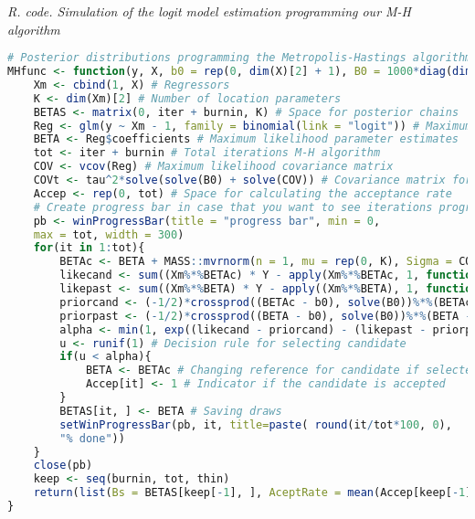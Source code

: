 \begin{tcolorbox}[enhanced,width=4.67in,center upper,
	fontupper=\large\bfseries,drop shadow southwest,sharp corners]
	\textit{R. code. Simulation of the logit model estimation programming our M-H algorithm}
	\begin{VF}
		\begin{lstlisting}[language=R]		
# Posterior distributions programming the Metropolis-Hastings algorithm
MHfunc <- function(y, X, b0 = rep(0, dim(X)[2] + 1), B0 = 1000*diag(dim(X)[2] + 1), tau = 1, iter = 6000, burnin = 1000, thin = 5){
	Xm <- cbind(1, X) # Regressors
	K <- dim(Xm)[2] # Number of location parameters
	BETAS <- matrix(0, iter + burnin, K) # Space for posterior chains
	Reg <- glm(y ~ Xm - 1, family = binomial(link = "logit")) # Maximum likelihood estimation
	BETA <- Reg$coefficients # Maximum likelihood parameter estimates 
	tot <- iter + burnin # Total iterations M-H algorithm
	COV <- vcov(Reg) # Maximum likelihood covariance matrix
	COVt <- tau^2*solve(solve(B0) + solve(COV)) # Covariance matrix for the proposal distribution
	Accep <- rep(0, tot) # Space for calculating the acceptance rate
	# Create progress bar in case that you want to see iterations progress
	pb <- winProgressBar(title = "progress bar", min = 0,
	max = tot, width = 300)
	for(it in 1:tot){
		BETAc <- BETA + MASS::mvrnorm(n = 1, mu = rep(0, K), Sigma = COVt) # Candidate location parameter
		likecand <- sum((Xm%*%BETAc) * Y - apply(Xm%*%BETAc, 1, function(x) log(1 + exp(x)))) # Log likelihood for the candidate
		likepast <- sum((Xm%*%BETA) * Y - apply((Xm%*%BETA), 1, function(x) log(1 + exp(x)))) # Log likelihood for the actual draw
		priorcand <- (-1/2)*crossprod((BETAc - b0), solve(B0))%*%(BETAc - b0) # Log prior for candidate
		priorpast <- (-1/2)*crossprod((BETA - b0), solve(B0))%*%(BETA - b0) # Log prior for actual draw
		alpha <- min(1, exp((likecand - priorcand) - (likepast - priorpast))) #Probability of selecting candidate
		u <- runif(1) # Decision rule for selecting candidate
		if(u < alpha){
			BETA <- BETAc # Changing reference for candidate if selected
			Accep[it] <- 1 # Indicator if the candidate is accepted
		} 
		BETAS[it, ] <- BETA # Saving draws
		setWinProgressBar(pb, it, title=paste( round(it/tot*100, 0),
		"% done"))
	}
	close(pb)
	keep <- seq(burnin, tot, thin)
	return(list(Bs = BETAS[keep[-1], ], AceptRate = mean(Accep[keep[-1]])))
}
\end{lstlisting}
	\end{VF}
\end{tcolorbox} 

